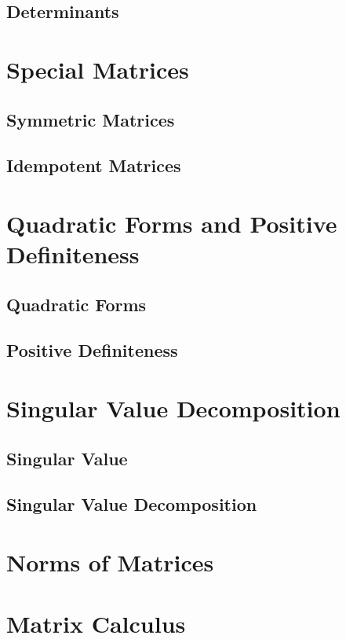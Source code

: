 \documentclass{article}
\begin{document}
\subsection{Determinants}

\section{Special Matrices}

\subsection{Symmetric Matrices}

\subsection{Idempotent Matrices} \label{subsection: idempotent}

\section{Quadratic Forms and Positive Definiteness}

\subsection{Quadratic Forms}

\subsection{Positive Definiteness}

\section{Singular Value Decomposition}

\subsection{Singular Value}

\subsection{Singular Value Decomposition}

\section{Norms of Matrices}

\section{Matrix Calculus}

\newpage


\end{document}
